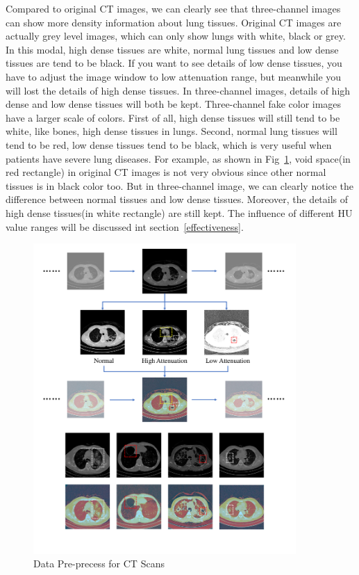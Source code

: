 \documentclass[journal]{IEEEtran}
\begin{document}
Compared to original CT images, we can clearly see that three-channel images can show more density information about lung tissues. Original CT images are actually grey level images, which can only show lungs with white, black or grey. In this modal, high dense tissues are white, normal lung tissues and low dense tissues are tend to be black. If you want to see details of low dense tissues, you have to adjust the image window to low attenuation range, but meanwhile you will lost the details of high dense tissues. In three-channel images, details of high dense and low dense tissues will both be kept. 
Three-channel fake color images have a larger scale of colors. First of all, high dense tissues will still tend to be white, like bones, high dense tissues in lungs. Second, normal lung tissues will tend to be red, low dense tissues tend to be black, which is very useful when patients have severe lung diseases. 
For example, as shown in Fig~\ref{3channel}, void space(in red rectangle) in original CT images is not very obvious since other normal tissues is in black color too. But in three-channel image, we can clearly notice the difference between normal tissues and low dense tissues. Moreover, the details of high dense tissues(in white rectangle) are still kept. The influence of different HU value ranges will be discussed int section~\ref{effectiveness}.

\begin{figure}[!t]
    \centerline{\includegraphics[width=100mm]{3channel.pdf}}
    \vspace{-1cm}
    \caption{Data Pre-precess for CT Scans}
    \vspace{-0cm}
    \label{3channel}
    \end{figure}
\end{document}
